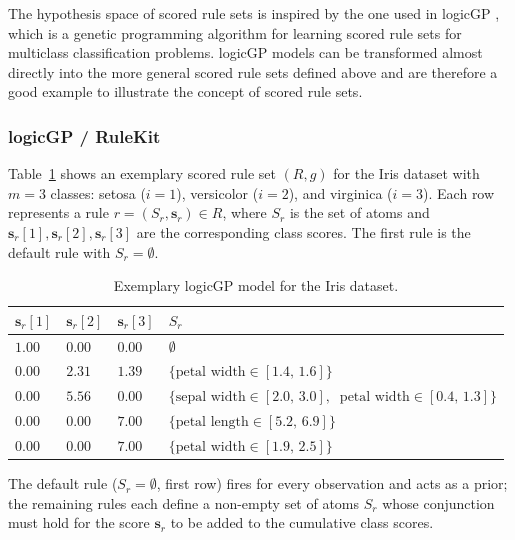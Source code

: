 \documentclass[a4paper,twoside]{article}
\begin{document}
The hypothesis space of scored rule sets is inspired by the one used in logicGP \citep{10.1145/3712255.3734300}, which is a genetic programming algorithm for learning scored rule sets for multiclass classification problems. logicGP models can be transformed almost directly into the more general scored rule sets defined above and are therefore a good example to illustrate the concept of scored rule sets.

\subsubsection{logicGP / RuleKit}

Table~\ref{tab:iris_example} shows an exemplary scored rule set $(R, g)$ for the Iris dataset with $m=3$ classes: setosa ($i=1$), versicolor ($i=2$), and virginica ($i=3$). Each row represents a rule $r = (S_r, \mathbf{s}_r) \in R$, where $S_r$ is the set of atoms and $\mathbf{s}_r[1], \mathbf{s}_r[2], \mathbf{s}_r[3]$ are the corresponding class scores. The first rule is the default rule with $S_r = \emptyset$.

\begin{table}
   \centering
  \caption{Exemplary logicGP model for the Iris dataset.}
   \label{tab:iris_example}
   \begin{tabular}{p{0.5cm} p{0.5cm} p{0.5cm} p{4.2cm}}
      \toprule
      $\mathbf{s}_r[1]$ & $\mathbf{s}_r[2]$ & $\mathbf{s}_r[3]$ & $S_r$ \\
      \midrule
      $1.00$ & $0.00$ & $0.00$ & $\emptyset$ \\
      $0.00$ & $2.31$ & $1.39$ & $\{\text{petal width} \in [1.4,\,1.6]\}$ \\
      $0.00$ & $5.56$ & $0.00$ & $\{\text{sepal width} \in [2.0,\,3.0],\ $ $\text{petal width} \in [0.4,\,1.3]\}$ \\
      $0.00$ & $0.00$ & $7.00$ & $\{\text{petal length} \in [5.2,\,6.9]\}$ \\
      $0.00$ & $0.00$ & $7.00$ & $\{\text{petal width} \in [1.9,\,2.5]\}$ \\
      \bottomrule
   \end{tabular}
\end{table}


The default rule ($S_r = \emptyset$, first row) fires for every observation and acts as a prior; the remaining rules each define a non-empty set of atoms $S_r$ whose conjunction must hold for the score $\mathbf{s}_r$ to be added to the cumulative class scores.
\end{document}
